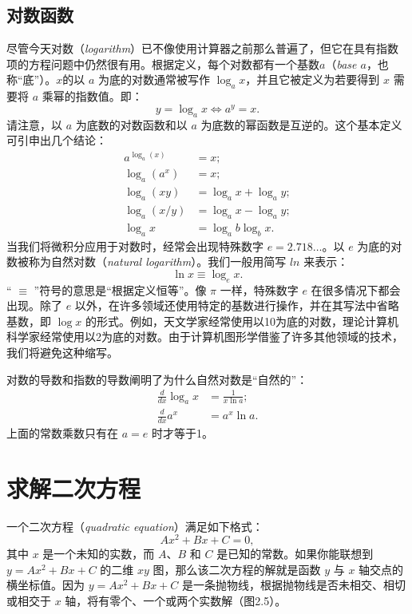 \marginpar{
  \begin{center}
    \texttt{[image: 2.4.png]}
    \captionof{figure}{在 $[3,5)$ 和 $[4,6]$ 上的区间操作。}
  \end{center}
}

\subsection{对数函数}

尽管今天对数（\textit{logarithm}）已不像使用计算器之前那么普遍了，但它在具有指数项的方程问题中仍然很有用。根据定义，每个对数都有一个基数$a$（\textit{base $a$}，也称“底”）。$x$的以 $a$ 为底的对数通常被写作 $\log_ax$，并且它被定义为若要得到 $x$ 需要将 $a$ 乘幂的指数值。即：
\[
  y = \log_ax \iff a^y = x.
\]
请注意，以 $a$ 为底数的对数函数和以 $a$ 为底数的幂函数是互逆的。这个基本定义可引申出几个结论：
\[
  \begin{aligned}
    a^{\log_a(x)} & = x;               \\
    \log_a(a^x)   & = x;               \\
    \log_a(xy)    & = \log_ax+\log_ay; \\
    \log_a(x/y)   & = \log_ax-\log_ay; \\
    \log_ax       & = \log_ab\log_bx.
  \end{aligned}
\]
当我们将微积分应用于对数时，经常会出现特殊数字 $e=2.718\ldots $。以 $e$ 为底的对数被称为自然对数（\textit{natural logarithm}）。我们一般用简写 $ln$ 来表示：
\[
  \ln x \equiv \log_ex.
\]
“ $\equiv$ ”符号的意思是“根据定义恒等”。像 $\pi$ 一样，特殊数字 $e$ 在很多情况下都会出现。除了 $e$ 以外，在许多领域还使用特定的基数进行操作，并在其写法中省略基数，即 $\log x$ 的形式。例如，天文学家经常使用以10为底的对数，理论计算机科学家经常使用以2为底的对数。由于计算机图形学借鉴了许多其他领域的技术，我们将避免这种缩写。

对数的导数和指数的导数阐明了为什么自然对数是“自然的”：
\[
  \begin{aligned}
    \frac{d}{d x} \log _{a} x & =\frac{1}{x \ln a}; \\
    \frac{d}{d x} a^{x}       & =a^{x} \ln a.
  \end{aligned}
\]
上面的常数乘数只有在 $a = e$ 时才等于1。

\section{求解二次方程}

一个二次方程（\textit{quadratic equation}）满足如下格式：
\[
  Ax^2+Bx+C=0,
\]
其中 $x$ 是一个未知的实数，而 $A$、$B$ 和 $C$ 是已知的常数。如果你能联想到 $y=Ax^2+Bx+C$ 的二维 $xy$ 图，那么该二次方程的解就是函数 $y$ 与 $x$ 轴交点的横坐标值。因为 $y=Ax^2+Bx+C$ 是一条抛物线，根据抛物线是否未相交、相切或相交于 $x$ 轴，将有零个、一个或两个实数解（图2.5）。

